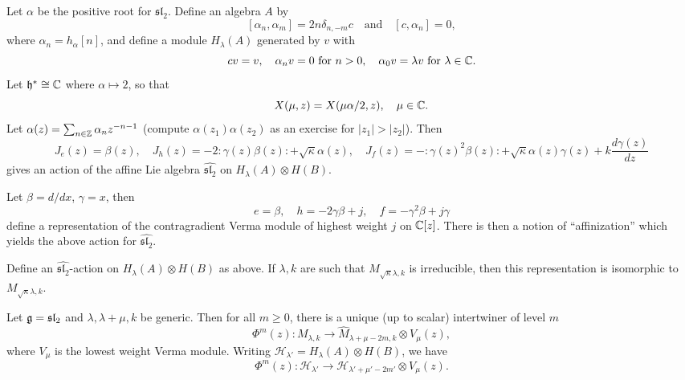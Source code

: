 \begin{remark}
  Let $\alpha$ be the positive root for
  $\mathfrak{sl}_2$.
  Define an algebra $A$ by 
  \[
    [\alpha_n, \alpha_m] = 2n \delta_{n, -m} c
    \quad \text{and} \quad
    [c, \alpha_n] = 0,
  \]
  where $\alpha_n = h_\alpha[n]$, and define
  a module
  $H_\lambda(A)$ generated by $v$ with
  \[
    cv = v, \quad \alpha_n v = 0 \text{ for } n > 0, \quad
    \alpha_0 v = \lambda v
    \text{ for } \lambda \in \mathbb{C}.
  \]
  Let
  $\mathfrak{h}^* \cong \mathbb{C}$ where
  $\alpha \mapsto 2$, so that
  \[
    X(\mu, z) = X(\mu \alpha / 2, z),
    \quad \mu \in \mathbb{C}.
  \]
  Let $\alpha(z) = \sum_{n \in \mathbb{Z}} \alpha_n z^{-n - 1}$
  (compute $\alpha(z_1) \alpha(z_2)$ as
  an exercise for $|z_1| > |z_2|$). Then
  \[
    J_e(z) = \beta(z), \quad
    J_h(z) = -2 {:} \gamma(z) \beta(z) {:} + \sqrt{\kappa} \alpha(z), \quad
    J_f(z) = - {:} \gamma(z)^2 \beta(z) {:} + \sqrt{\kappa} \alpha(z) \gamma(z) + k \frac{d\gamma(z)}{dz}
  \]
  gives an action of the affine Lie
  algebra
  $\widehat{\mathfrak{sl}_2}$
  on $H_\lambda(A) \otimes H(B)$.
\end{remark}

\begin{remark}
  Let $\beta = d / dx$, $\gamma = x$, then
  \[
    e = \beta, \quad h = -2 \gamma \beta + j,
    \quad f = -\gamma^2 \beta + j \gamma
  \]
  define a representation of
  the contragradient Verma module of highest
  weight $j$ on $\mathbb{C}[z]$. There is then a
  notion of ``affinization'' which
  yields the above action for
  $\widehat{\mathfrak{sl}_2}$.
\end{remark}

\begin{theorem}
  Define an $\widehat{\mathfrak{sl}_2}$-action
  on $H_\lambda(A) \otimes H(B)$ as above.
  If $\lambda, k$ are such that
  $M_{\sqrt{\kappa} \lambda, k}$ is irreducible,
  then this representation is isomorphic
  to $M_{\sqrt{\kappa} \lambda, k}$.
\end{theorem}

\begin{remark}
  Let $\mathfrak{g} = \mathfrak{sl}_2$ and
  $\lambda, \lambda + \mu, k$
  be generic. Then for all $m \ge 0$, there
  is a unique (up to scalar)
  intertwiner of level $m$
  \[
    \Phi^m(z)
    : M_{\lambda, k}
    \longrightarrow \widehat{M}_{\lambda + \mu - 2m, k} \otimes V_\mu(z),
  \]
  where $V_\mu$ is the lowest weight Verma
  module. Writing
  $\mathcal{H}_{\lambda'} = H_\lambda(A) \otimes H(B)$, we have
  \[
    \Phi^m(z)
    : \mathcal{H}_{\lambda'}
    \longrightarrow
    \mathcal{H}_{\lambda' + \mu' - 2m'}
    \otimes V_\mu(z).
  \]
\end{remark}

